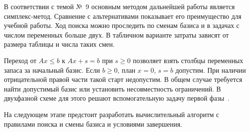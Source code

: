 В соответствии с темой №~9 основным методом дальнейшей работы
является симплекс-метод. Сравнение с альтернативами показывает его
преимущество для учебной работы. Ход поиска можно проследить по сменам
базиса и в задачах с числом переменных больше двух. В табличном варианте
затраты зависят от размера таблицы и числа таких смен.

Переход от $Ax\le b$ к $Ax+s=b$ при $s\ge 0$ позволяет взять столбцы
переменных запаса за начальный базис. Если $b\ge 0$, план $x=0$, $s=b$
допустим. При наличии отрицательной правой части такой старт недопустим.
В общем случае требуется найти допустимый базис или установить
несовместность ограничений. В двухфазной схеме для этого решают
вспомогательную задачу первой фазы~\cite{vanderbei2020}.

На следующем этапе предстоит разработать вычислительный алгоритм с
правилами поиска и смены базиса и условиями завершения.
